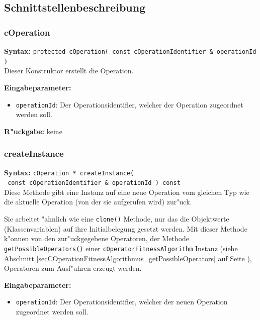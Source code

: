 

\subsection{Schnittstellenbeschreibung}

\subsubsection{cOperation}

\textbf{Syntax:} \verb|protected cOperation( const cOperationIdentifier & operationId )| \\

Dieser Konstruktor erstellt die Operation.

\bigskip\noindent
\textbf{Eingabeparameter:}
\begin{itemize}
 \item \verb|operationId|: Der Operationsidentifier, welcher der Operation zugeordnet werden soll.
\end{itemize}

\bigskip\noindent
\textbf{R"uckgabe:} keine


\subsubsection{createInstance}

\textbf{Syntax:} \verb|cOperation * createInstance(| \\\verb| const cOperationIdentifier & operationId ) const| \\

Diese Methode gibt eine Instanz auf eine neue Operation vom gleichen Typ wie die aktuelle Operation (von der sie aufgerufen wird) zur"uck.

Sie arbeitet "ahnlich wie eine \verb|clone()| Methode, nur das die Objektwerte (Klassenvariablen) auf ihre Initialbelegung gesetzt werden.
Mit dieser Methode k"onnen von den zur"uckgegebene Operatoren, der Methode \verb|getPossibleOperators()| einer \verb|cOperatorFitnessAlgorithm| Instanz (siehe Abschnitt \ref{secCOperationFitnessAlgorithmus_getPossibleOperators} auf Seite \pageref{secCOperationFitnessAlgorithmus_getPossibleOperators}), Operatoren zum Ausf"uhren erzeugt werden.

\bigskip\noindent
\textbf{Eingabeparameter:}
\begin{itemize}
 \item \verb|operationId|: Der Operationsidentifier, welcher der neuen Operation zugeordnet werden soll.
\end{itemize}

